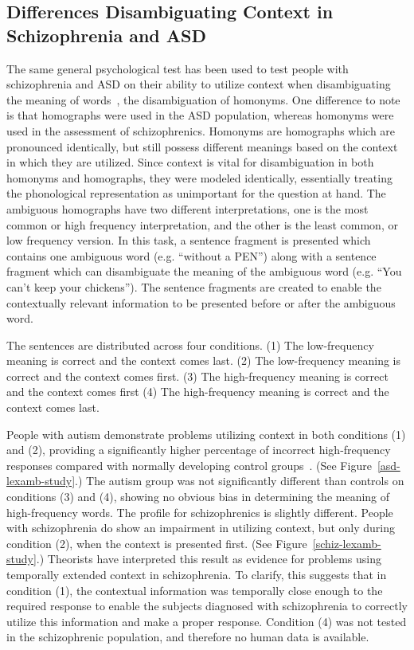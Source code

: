 \subsection{Differences Disambiguating Context in Schizophrenia and ASD}
The same general psychological test has been used to test people with schizophrenia and ASD on their ability to utilize context when disambiguating the meaning of words~\cite{CohenJD:1992:Schizophrenia,RefWorks:103,HappeF:1997:WCC_Homographs}, the disambiguation of homonyms. One difference to note is that homographs were used in the ASD population, whereas homonyms were used in the assessment of schizophrenics.  Homonyms are homographs which are pronounced identically, but still possess different meanings based on the context in which they are utilized.  Since context is vital for disambiguation in both homonyms and homographs, they were modeled identically, essentially treating the phonological representation as unimportant for the question at hand.  The ambiguous homographs have two different interpretations, one is the most common or high frequency interpretation, and the other is the least common, or low frequency version.  In this task, a sentence fragment is presented which contains one ambiguous word (e.g. ``without a PEN'') along with a sentence fragment which can disambiguate the meaning of the ambiguous word (e.g. ``You can't keep your chickens'').  The sentence fragments are created to enable the contextually relevant information to be presented before or after the ambiguous word.

The sentences are distributed across four conditions.  (1)  The low-frequency meaning is correct and the context comes last. (2)  The low-frequency meaning is correct and the context comes first.  (3)  The high-frequency meaning is correct and the context comes first (4) The high-frequency meaning is correct and the context comes last.

People with autism demonstrate problems utilizing context in both conditions (1) and (2), providing a significantly higher percentage of incorrect high-frequency responses compared with normally developing control groups~\cite{RefWorks:103,HappeF:1997:WCC_Homographs}.  (See Figure~\ref{asd-lexamb-study}.)  The autism group was not significantly different than controls on conditions (3) and (4), showing no obvious bias in determining the meaning of high-frequency words.  The profile for schizophrenics is slightly different.  People with schizophrenia do show an impairment in utilizing context, but only during condition (2), when the context is presented first. (See Figure~\ref{schiz-lexamb-study}.)  Theorists have interpreted this result as evidence for problems using temporally extended context in schizophrenia.  To clarify, this suggests that in condition (1), the contextual information was temporally close enough to the required response to enable the subjects diagnosed with schizophrenia to correctly utilize this information and make a proper response.  Condition (4) was not tested in the schizophrenic population, and therefore no human data is available.  

